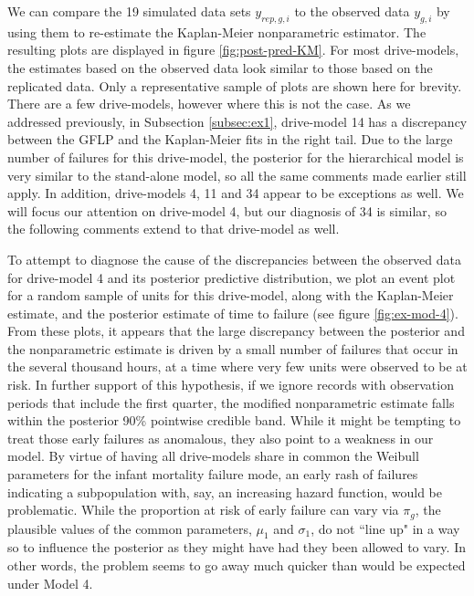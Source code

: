 \documentclass[12pt]{article}
\begin{document}
We can compare the 19 simulated data sets $y_{rep,g, i}$ to the observed data $y_{g,i}$ by using them to re-estimate the Kaplan-Meier nonparametric estimator. The resulting plots are displayed in figure \ref{fig:post-pred-KM}. For most drive-models, the estimates based on the observed data look similar to those based on the replicated data. Only a representative sample of plots are shown here for brevity. There are a few drive-models, however where this is not the case. As we addressed previously, in Subsection \ref{subsec:ex1}, drive-model 14 has a discrepancy between the GFLP and the Kaplan-Meier fits in the right tail. Due to the large number of failures for this drive-model, the posterior for the hierarchical model is very similar to the stand-alone model, so all the same comments made earlier still apply. In addition, drive-models 4, 11 and 34 appear to be exceptions as well. We will focus our attention on drive-model 4, but our diagnosis of 34 is similar, so the following comments extend to that drive-model as well.


To attempt to diagnose the cause of the discrepancies between the observed data for drive-model 4 and its posterior predictive distribution, we plot an event plot for a random sample of units for this drive-model, along with the Kaplan-Meier estimate, and the posterior estimate of time to failure (see figure \ref{fig:ex-mod-4}). From these plots, it appears that the large discrepancy between the posterior and the nonparametric estimate is driven by a small number of failures that occur in the several thousand hours, at a time where very few units were observed to be at risk. In further support of this hypothesis, if we ignore records with observation periods that include the first quarter, the modified nonparametric estimate falls within the posterior 90\% pointwise credible band. While it might be tempting to treat those early failures as anomalous, they also point to a weakness in our model. By virtue of having all drive-models share in common the Weibull parameters for the infant mortality failure mode, an early rash of failures indicating a subpopulation with, say, an increasing hazard function,  would be problematic. While the proportion at risk of early failure can vary via $\pi_g$, the plausible values of the common parameters, $\mu_1$ and $\sigma_1$, do not ``line up" in a way so to influence the posterior as they might have had they been allowed to vary. In other words, the problem seems to go away much quicker than would be expected under Model 4.
\end{document}
